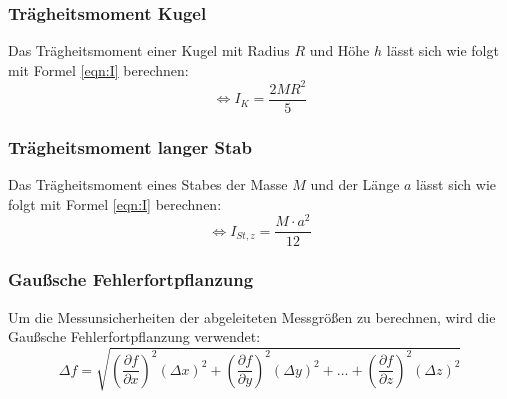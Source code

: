 \subsubsection{Trägheitsmoment Kugel}

Das Trägheitsmoment einer Kugel mit Radius $R$ und Höhe $h$ lässt sich wie folgt mit Formel \ref{eqn:I} berechnen:
\begin{equation}
    \label{eqn:Ik}
    \Leftrightarrow I_K = \frac{2MR^2}{5}
\end{equation}

\subsubsection{Trägheitsmoment langer Stab}

Das Trägheitsmoment eines Stabes der Masse $M$ und der Länge $a$ lässt sich wie folgt mit Formel \ref{eqn:I} berechnen:
\begin{equation}
    \Leftrightarrow I_{St,z} = \frac{M \cdot a^2}{12}
\end{equation}


\subsubsection{Gaußsche Fehlerfortpflanzung}

Um die Messunsicherheiten der abgeleiteten Messgrößen zu berechnen, wird die Gaußsche Fehlerfortpflanzung verwendet:
\begin{equation}
    \label{eqn:Gauss}
    \Delta f = \sqrt{\left( \frac{\partial f}{\partial x} \right)^2 (\Delta x)^2 + \left( \frac{\partial f}{\partial y} \right)^2 (\Delta y)^2 + \ldots + \left( \frac{\partial f}{\partial z} \right)^2 (\Delta z)^2 }
\end{equation}
\newpage